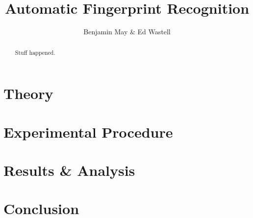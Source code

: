 \documentclass[11pt,a4paper]{article}
\title{Automatic Fingerprint Recognition}
\author{Benjamin May \& Ed Wastell}
\begin{document}
\maketitle

\begin{abstract}
Stuff happened.
\end{abstract}

\begin{multicols}{2}

\section{Theory}


\section{Experimental Procedure}

\section{Results \& Analysis}

\section{Conclusion}


\printbibliography

\end{multicols}
\end{document}
